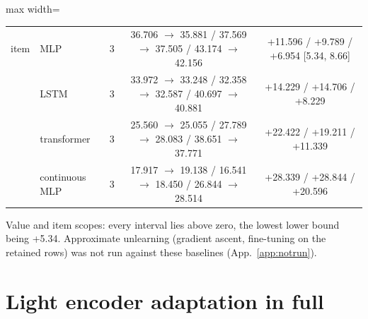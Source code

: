 \documentclass{article} %
\begin{document}
\begin{table}[h]
\begin{adjustbox}{max width=\linewidth}
\begin{tabular}{llccc}
item & MLP & 3 & 36.706 $\to$ 35.881 / 37.569 $\to$ 37.505 / 43.174 $\to$ 42.156 & +11.596 / +9.789 / +6.954 [5.34, 8.66] \\
 & LSTM & 3 & 33.972 $\to$ 33.248 / 32.358 $\to$ 32.587 / 40.697 $\to$ 40.881 & +14.229 / +14.706 / +8.229 \\
 & transformer & 3 & 25.560 $\to$ 25.055 / 27.789 $\to$ 28.083 / 38.651 $\to$ 37.771 & +22.422 / +19.211 / +11.339 \\
 & continuous MLP & 3 & 17.917 $\to$ 19.138 / 16.541 $\to$ 18.450 / 26.844 $\to$ 28.514 & +28.339 / +28.844 / +20.596 \\
\bottomrule
\end{tabular}\end{adjustbox}
\end{table}

\noindent Value and item scopes: every interval lies above zero, the lowest lower bound being %
+5.34. Approximate unlearning (gradient ascent, fine-tuning on the retained rows) was not run %
against these baselines (App.~\ref{app:notrun}).
\section{Light encoder adaptation in full}
\label{app:adapt}
\end{document}
